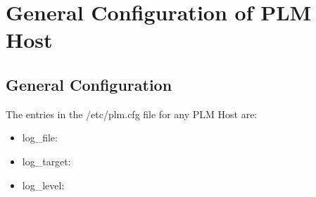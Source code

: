 \section {General Configuration of PLM Host}

\subsection{General Configuration}
The entries in the /etc/plm.cfg file for any PLM Host are:

\begin{itemize}
\item log\_file: 
\item log\_target: 
\item log\_level:
\end{itemize}
